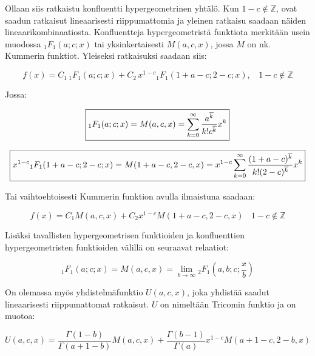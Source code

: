 \documentclass[../johdoksia.tex]{subfiles}
\begin{document}
	Ollaan siis ratkaistu konfluentti hypergeometrinen yhtälö. Kun $1 - c \notin\mathbb{Z}$, ovat saadun ratkaisut lineaarisesti riippumattomia ja yleinen ratkaisu saadaan näiden lineaarikombinaatiosta. Konfluentteja hypergeometristä funktiota merkitään usein muodossa ${_1{F}_1}(a; c; x)$ tai yksinkertaisesti $M(a, c, x)$, jossa $M$ on nk. Kummerin funktiot. Yleiseksi ratkaisuksi saadaan siis:
	
	\begin{equation}
		\boxed{f(x) = C_1\,{_1{F}_1}(a; c; x) + C_2\,x^{1 - c}{_1{F}_1}(1 + a - c; 2 - c; x), \ \ \ \ 1 - c\notin\mathbb{Z}}
	\end{equation}

	Jossa:
	
	\begin{equation}
		\boxed{{_1{F}_1}(a; c; x) = M(a, c, x) = \sum_{k = 0}^{\infty}\frac{a^{\overline{k}}}{k!c^{\overline{k}}}x^{k}}
	\end{equation}

	\begin{equation}
		\boxed{x^{1 - c}{_1{F}_1}(1 + a - c; 2 - c; x) = M(1 + a - c, 2 - c, x) = x^{1 - c}\sum_{k = 0}^{\infty}\frac{(1 + a - c)^{\overline{k}}}{k!(2 - c)^{\overline{k}}}x^{k}}
	\end{equation}

	Tai vaihtoehtoisesti Kummerin funktion avulla ilmaistuna saadaan:
	
	\begin{equation}
		\boxed{f(x) = C_1M(a, c, x) + C_2x^{1 - c}M(1 + a - c, 2 - c, x) \ \ \ \ 1 - c\notin\mathbb{Z}}
	\end{equation}

	Lisäksi tavallisten hypergeometrisen funktioiden ja konfluenttien hypergeometristen funktioiden välillä on seuraavat relaatiot:
	
	\begin{equation}
		\boxed{{_1{F}_1}(a; c; x) = M(a, c, x) = \lim_{b\to\infty}{_2{F}_1}\left(a, b; c; \frac{x}{b}\right)}
	\end{equation}
	 
	On olemassa myös yhdistelmäfunktio $U(a, c, x)$, joka yhdistää saadut lineaarisesti riippumattomat ratkaisut. $U$ on nimeltään Tricomin funktio ja on muotoa:

	\begin{equation}
		\boxed{U(a, c, x) = \frac{\Gamma(1 - b)}{\Gamma(a + 1 - b)}M(a, c, x) + \frac{\Gamma(b - 1)}{\Gamma(a)}x^{1 - c}M(a + 1 - c, 2 - b, x)}
	\end{equation}
\end{document}

